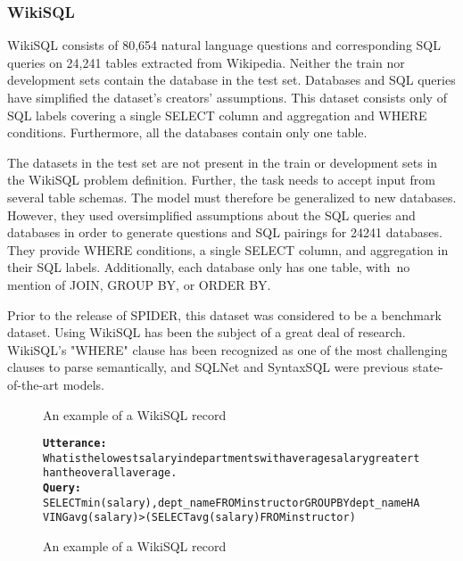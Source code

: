 \subsubsection{WikiSQL}

WikiSQL\cite{DBLP:journals/corr/abs-1902-01069} consists of 80,654 natural language questions and corresponding SQL queries on 24,241 tables extracted from Wikipedia. Neither the train nor development sets contain the database in the test set. Databases and SQL queries have simplified the dataset's creators' assumptions. This dataset consists only of SQL labels covering a single SELECT column and aggregation and WHERE conditions. Furthermore, all the databases contain only one table.

The datasets in the test set are not present in the train or development sets in the WikiSQL problem definition. Further, the task needs to accept input from several table schemas. The model must therefore be generalized to new databases. However, they used oversimplified assumptions about the SQL queries and databases in order to generate questions and SQL pairings for 24241 databases. They provide WHERE conditions, a single SELECT column, and aggregation in their SQL labels. Additionally, each database only has one table, with no mention of JOIN, GROUP BY, or ORDER BY.

Prior to the release of SPIDER, this dataset was considered to be a benchmark dataset. Using WikiSQL has been the subject of a great deal of research. WikiSQL's "WHERE" clause has been recognized as one of the most challenging clauses to parse semantically, and SQLNet and SyntaxSQL were previous state-of-the-art models.




\begin{figure}[H]
    \label{fig:WikiSQL}
    \begin{AIbox}{An example of a WikiSQL record}
        \vspace{-5px}
        \parbox{1\textwidth}{\scriptsize
        \begin{alltt} \larger
            {\bf Utterance:} \\ 
            What is the lowest salary in departments with average salary greater than the overall average.
            \\
            {\bf Query:} \\
            SELECT min(salary) ,  dept\_name FROM instructor GROUP BY dept\_name HAVING avg(salary)  >  (SELECT avg(salary) FROM instructor)
        \end{alltt}
        }
        \vspace{-5px}
    \end{AIbox}
    \caption{An example of a WikiSQL record}
  \end{figure}

